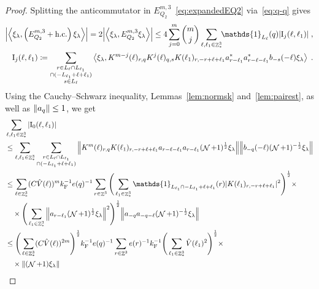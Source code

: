 \documentclass[12pt,a4paper]{article}
\numberwithin{equation}{section}
\newcommand{\1}{\mathbb{I}}
\newcommand{\F}{\mathrm{F}}
\newcommand{\I}{\mathrm{I}}
\DeclareMathOperator{\Z}{\mathbb{Z}}
\DeclareMathOperator{\NN}{\mathcal{N}}
\newcommand{\half}{\frac{1}{2}}
\newcommand{\eva}[1]{\left\langle #1 \right\rangle}
\theoremstyle{plain}
\theoremstyle{definition}
\theoremstyle{remark}
\theoremstyle{plain}
\theoremstyle{definition}
\theoremstyle{remark}
\begin{document}
\begin{proof}
Splitting the anticommutator in $ E^{m,3}_{Q_2} $~\eqref{eq:expandedEQ2} via~\eqref{eq:q-q} gives
\begin{equation} \label{eq:EQ2151}
\begin{aligned}
	\abs{\eva{\xi_\lambda,\left(E^{m,3}_{Q_2}+\mathrm{h.c.}\right) \xi_\lambda }} 
	= 2\abs{\eva{\xi_\lambda, E^{m,3}_{Q_2} \xi_\lambda }}
	\le 4 \sum_{j=0}^m {{m}\choose j} \sum\limits_{\ell,\ell_1 \in \Z^3_*}\!\! \mathds{1}_{L_\ell}(q) |\I_j(\ell, \ell_1)| \;,\\
	\I_j(\ell, \ell_1)
	\coloneq \sum\limits_{\substack{r\in L_{\ell} \cap L_{\ell_1}\\ \cap (-L_{\ell_1}+\ell+\ell_1)\\ s \in L_{\ell}}} 
		\eva{\xi_\lambda, K^{m-j}(\ell)_{r,q} K^{j}(\ell)_{q,s} K(\ell_1)_{r,-r+\ell+\ell_1} a^*_{r-\ell_1} a^*_{r-\ell-\ell_1} b_{-s}(-\ell) \xi_\lambda} \;. \\
\end{aligned}
\end{equation}
Using the Cauchy--Schwarz inequality, Lemmas~\ref{lem:normsk} and~\ref{lem:pairest}, as well as $ \norm{a_q} \le 1 $, we get
\textcolor{green!30!black}{
\begin{align}
	&\sum_{\ell,\ell_1 \in \Z^3_*} |\I_0(\ell, \ell_1)| \nonumber\\
	&\leq \sum_{\ell,\ell_1 \in \Z^3_*} \sum\limits_{\substack{r\in L_{\ell} \cap L_{\ell_1} \\ \cap (-L_{\ell_1}+\ell+\ell_1)}}
		\norm{K^m(\ell)_{r,q} K(\ell_1)_{r,-r+\ell+\ell_1} a_{r-\ell-\ell_1} a_{r-\ell_1} (\NN+1)^\half \xi_\lambda}
		\norm{ b_{-q}(-\ell) (\NN+1)^{-\half} \xi_\lambda}\nonumber\\
	&\leq \sum_{\ell \in \Z^3_*} (C \hat{V}(\ell))^m 
		k_{\F}^{-1} e(q)^{-1} \sum\limits_{r \in \Z^3}
		\Bigg( \sum_{\ell_1 \in \Z^3_*} \mathds{1}_{L_{\ell_1} \cap -L_{\ell_1}+\ell+\ell_1 }(r) |K(\ell_1)_{r,-r+\ell+\ell_1}|^2 \Bigg)^{\half} \times \nonumber\\
	&\quad \times \Bigg( \sum_{\ell_1 \in \Z^3_*} \norm{a_{r-\ell_1} (\NN+1)^\half \xi_\lambda}^2 \Bigg)^{\half}
		\norm{ a_{-q} a_{-q-\ell} (\NN+1)^{-\half} \xi_\lambda}\nonumber\\
	&\leq \Bigg( \sum_{\ell \in \Z^3_*} (C \hat{V}(\ell))^{2m} \Bigg)^{\half} 
		k_{\F}^{-1} e(q)^{-1} \sum\limits_{r \in \Z^3} e(r)^{-1} k_{\F}^{-1}
		\Bigg( \sum_{\ell_1 \in \Z^3_*} \hat{V}(\ell_1)^2 \Bigg)^{\half} \times \nonumber\\
	&\quad \times \norm{(\NN+1) \xi_\lambda}

\end{align}}
\end{proof}
\end{document}
